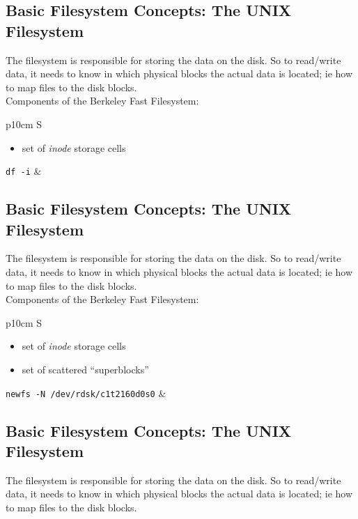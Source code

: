 \documentclass[xga]{xdvislides}
\begin{document}
\subsection{Basic Filesystem Concepts: The UNIX Filesystem}
The filesystem is responsible for storing the data on the disk.
So to read/write data, it needs to know in which physical blocks the actual
data is located; ie how to map files to the disk blocks.
\\

Components of the Berkeley Fast Filesystem:
\\

\begin{tabular}{ p{10cm} S }
\begin{itemize}
	\item set of {\em inode} storage cells
\end{itemize}
{\tt df -i}
&  \\
\end{tabular}

\subsection{Basic Filesystem Concepts: The UNIX Filesystem}
The filesystem is responsible for storing the data on the disk.
So to read/write data, it needs to know in which physical blocks the actual
data is located; ie how to map files to the disk blocks.
\\

Components of the Berkeley Fast Filesystem:
\\

\begin{tabular}{ p{10cm} S }
\begin{itemize}
	\item set of {\em inode} storage cells
	\item set of scattered ``superblocks''
\end{itemize}
{\tt newfs -N /dev/rdsk/c1t2160d0s0}
&  \\
\end{tabular}

\subsection{Basic Filesystem Concepts: The UNIX Filesystem}
The filesystem is responsible for storing the data on the disk.
So to read/write data, it needs to know in which physical blocks the actual
data is located; ie how to map files to the disk blocks.
\\
\end{document}
